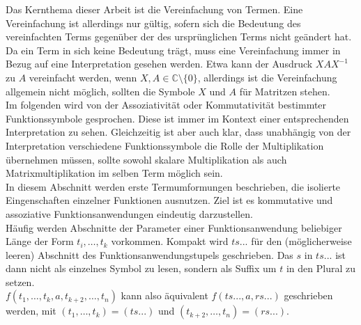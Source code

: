 \documentclass{scrartcl}
\numberwithin{figure}{section} %
\theoremstyle{definition} %
\newcommand{\elems}[3]{{#1}_{#2}, \dots, {#1}_{#3}}
\begin{document}
Das Kernthema dieser Arbeit ist die Vereinfachung von Termen. Eine Vereinfachung ist allerdings nur gültig, sofern sich die Bedeutung des vereinfachten Terms gegenüber der des ursprünglichen Terms nicht geändert hat. Da ein Term in sich keine Bedeutung trägt, muss eine Vereinfachung immer in Bezug auf eine Interpretation gesehen werden. Etwa kann der Ausdruck $X A X^{-1}$ zu $A$ vereinfacht werden, wenn $X, A \in \mathbb{C} \setminus \{0\}$, allerdings ist die Vereinfachung allgemein nicht möglich, sollten die Symbole $X$ und $A$ für Matritzen stehen. \\
Im folgenden wird von der Assoziativität oder Kommutativität bestimmter Funktionssymbole gesprochen. Diese ist immer im Kontext einer entsprechenden Interpretation zu sehen. Gleichzeitig ist aber auch klar, dass unabhängig von der Interpretation verschiedene Funktionssymbole die Rolle der Multiplikation übernehmen müssen, sollte sowohl skalare Multiplikation als auch Matrixmultiplikation im selben Term möglich sein. \\

In diesem Abschnitt werden erste Termumformungen beschrieben, die isolierte Eingenschaften einzelner Funktionen ausnutzen. Ziel ist es kommutative und assoziative Funktionsanwendungen eindeutig darzustellen.\\

Häufig werden Abschnitte der Parameter einer Funktionsanwendung beliebiger Länge der Form $\elems t i k$ vorkommen. Kompakt wird $ts...$ für den (möglicherweise leeren) Abschnitt des Funktionsanwendungstupels geschrieben. Das $s$ in $ts...$ ist dann nicht als einzelnes Symbol zu lesen, sondern als Suffix um $t$ in den Plural zu setzen. \\$f(\elems t 1 k, a, \elems t {k+2} n)$ kann also äquivalent $f(ts..., a, rs...)$ geschrieben werden, mit $(\elems t 1 k) = (ts...)$ und $(\elems t {k+2} n) = (rs...)$.\\
\end{document}
